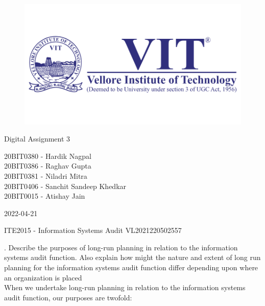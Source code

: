 \documentclass[12pt]{article}
\begin{document}
\begin{titlepage}
\NoBgThispage
   \begin{center}
        \begin{figure}[h] %
        \centering
        \includegraphics[width=15cm]{1583124354phpJTtnK5.png}
        \end{figure}

        \Huge{Digital Assignment 3}

        \vspace{0.5cm}
        \LARGE{20BIT0380 - Hardik Nagpal\\20BIT0386 - Raghav Gupta\\20BIT0381 - Niladri Mitra\\20BIT0406 - Sanchit Sandeep Khedkar\\20BIT0015 - Atishay Jain}
       
        \vspace{2.5 cm}
        \Large{2022-04-21}
        
        \vspace{0.25 cm}
        \Large{ITE2015 - Information Systems Audit}
        \large{VL2021220502557}
       

       \vfill
    \end{center}
\end{titlepage}
. Describe the purposes of long-run planning in relation to the information systems audit function. Also explain how might the nature and extent of long run planning for the information systems audit function differ depending upon where an organization is placed\\
When we undertake long-run planning in relation to the information systems audit function, our purposes are twofold:\\ 
\end{document}

